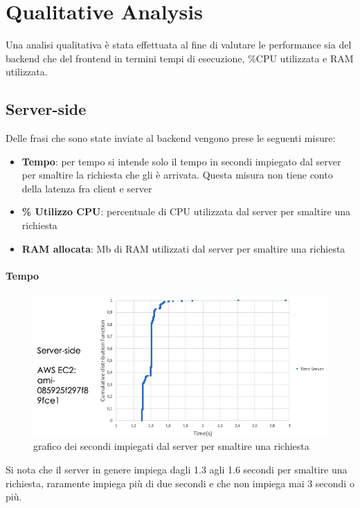 \section{Qualitative Analysis}
\label{sec:quantitative}
Una analisi qualitativa è stata effettuata al fine di valutare le performance sia del backend che del frontend in termini tempi di esecuzione, \%CPU utilizzata e RAM utilizzata.
\subsection{Server-side}
\label{sec:quantbackend}
Delle frasi che sono state inviate al backend vengono prese le seguenti misure:
\begin{itemize}
    \item \textbf{Tempo}: per tempo si intende solo il tempo in secondi impiegato dal server per smaltire la richiesta che gli è arrivata. Questa misura non tiene conto della latenza fra client e server
    \item \textbf{\% Utilizzo CPU}: percentuale di CPU utilizzata dal server per smaltire una richiesta 
    \item \textbf{RAM allocata}: Mb di RAM utilizzati dal server per smaltire una richiesta
\end{itemize}

\paragraph{Tempo}

\begin{figure}[h!t]
    \centering
    \includegraphics[width=15cm]{Figure/quantitativa/timeSrv.png}
    \caption{grafico dei secondi impiegati dal server per smaltire una richiesta}
    \label{fig:srvTime}
\end{figure}
\FloatBarrier

Si nota che il server in genere impiega dagli 1.3 agli 1.6 secondi per smaltire una richiesta, raramente impiega più di due secondi e che non impiega mai 3 secondi o più.


